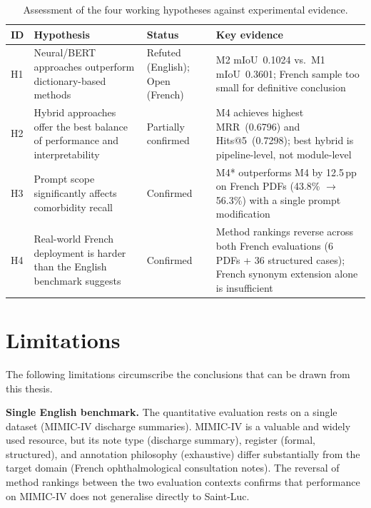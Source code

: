 \begin{table}[htbp]
\centering
\scriptsize
\caption{Assessment of the four working hypotheses against experimental evidence.}
\label{tab:hypothesis_summary}
\begin{threeparttable}
\begin{tabular}{L{0.7cm}L{4.6cm}L{1.8cm}L{4.2cm}}
\toprule
\textbf{ID} & \textbf{Hypothesis} & \textbf{Status} & \textbf{Key evidence} \\
\midrule
H1 & Neural/BERT approaches outperform dictionary-based methods &
    Refuted (English); Open (French) &
    M2 mIoU~0.1024 vs.\ M1 mIoU~0.3601; French sample too small for definitive conclusion \\
\addlinespace
H2 & Hybrid approaches offer the best balance of performance and interpretability &
    Partially confirmed &
    M4 achieves highest MRR~(0.6796) and Hits@5~(0.7298); best hybrid is pipeline-level, not module-level \\
\addlinespace
H3 & Prompt scope significantly affects comorbidity recall &
    Confirmed &
    M4* outperforms M4 by 12.5\,pp on French PDFs (43.8\% $\to$ 56.3\%) with a single prompt modification \\
\addlinespace
H4 & Real-world French deployment is harder than the English benchmark suggests &
    Confirmed &
    Method rankings reverse across both French evaluations (6 PDFs + 36 structured cases); French synonym extension alone is insufficient \\
\bottomrule
\end{tabular}
\end{threeparttable}
\end{table}

\section{Limitations}

The following limitations circumscribe the conclusions that can be drawn from this thesis.

\textbf{Single English benchmark.} The quantitative evaluation rests on a single dataset (MIMIC-IV discharge summaries). MIMIC-IV is a valuable and widely used resource, but its note type (discharge summary), register (formal, structured), and annotation philosophy (exhaustive) differ substantially from the target domain (French ophthalmological consultation notes). The reversal of method rankings between the two evaluation contexts confirms that performance on MIMIC-IV does not generalise directly to Saint-Luc.

